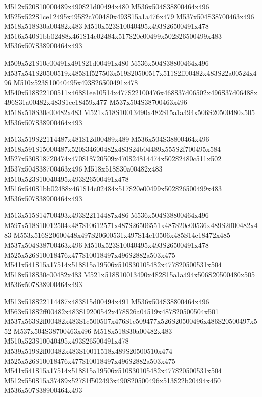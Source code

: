 \documentclass{article}
\begin{document}
\begin{multicols}{5}
\begin{center}

M512x520S10000489x490S21d00494x480 %
M536x504S38800464x496 %
M525x522S1ce12495x495S2c700480x493S15a1a476x479 %
M537x504S38700463x496 %
M518x518S30a00482x483 %
M510x523S10040495x493S26500491x478 %
M516x540S1bb02488x461S14c02484x517S20e00499x502S26500499x483 %
M536x507S38900464x493 %
\vfil
\columnbreak

M509x521S10e00491x491S21d00491x480 %
M536x504S38800464x496 %
M537x541S20500519x485S1f527503x519S20500517x511S2ff00482x483S22a00524x496 %
M510x523S10040495x493S26500491x478 %
M540x518S22100511x468S1ee10514x477S22100476x468S37d06502x496S37d06488x496S31a00482x483S1ee18459x477 %
M537x504S38700463x496 %
M518x518S30c00482x483 %
M521x518S10013490x482S15a1a494x506S20500480x505 %
M536x507S38900464x493 %
\vfil
\columnbreak

M513x519S22114487x481S12d00489x489 %
M536x504S38800464x496 %
M518x591S15000487x520S34600482x483S24b04489x555S2f700495x584 %
M527x530S18720474x470S18720509x470S24814474x502S2480c511x502 %
M537x504S38700463x496 %
M518x518S30a00482x483 %
M510x523S10040495x493S26500491x478 %
M516x540S1bb02488x461S14c02484x517S20e00499x502S26500499x483 %
M536x507S38900464x493 %
\vfil
\columnbreak

M513x515S14700493x493S22114487x486 %
M536x504S38800464x496 %
M597x518S10012504x487S10612571x487S26506551x487S20e00536x489S2ff00482x483 %
M553x516S20600448x497S20600531x497S14c10506x485S14c18472x485 %
M537x504S38700463x496 %
M510x523S10040495x493S26500491x478 %
M525x526S10018476x477S10018497x496S2882a503x475 %
M541x541S15a17514x518S15a19506x510S30105482x477S20500531x504 %
M518x518S30c00482x483 %
M521x518S10013490x482S15a1a494x506S20500480x505 %
M536x507S38900464x493 %
\vfil
\columnbreak

M513x518S22114487x483S15d00494x491 %
M536x504S38800464x496 %
M563x518S2ff00482x483S19200542x478S26a04519x487S20500504x501 %
M537x563S2ff00482x483S1c500507x476S1c509477x526S20500496x486S20500497x552 %
M537x504S38700463x496 %
M518x518S30a00482x483 %
M510x523S10040495x493S26500491x478 %
M539x519S2ff00482x483S10011518x489S20500510x474 %
M525x526S10018476x477S10018497x496S2882a503x475 %
M541x541S15a17514x518S15a19506x510S30105482x477S20500531x504 %
M512x550S15a37489x527S1f502493x490S20500496x513S22b20494x450 %
M536x507S38900464x493 %
\vfil

\end{center}
\end{multicols}
\end{document}
